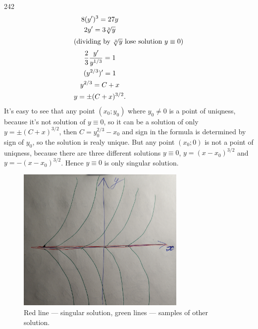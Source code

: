 \documentclass[12pt,a4paper]{article}
\begin{document}
    \begin{problem}{242}
        \begin{gather*}
            8(y')^3 = 27 y\\
            2y' = 3 \sqrt[3]{y}\\
            \intertext{(dividing by $\sqrt[3]{y}$ lose solution $y \equiv 0$)}
            \frac{2}{3} \frac{y'}{y^{1/3}} = 1\\
            (y^{2/3})' = 1\\
            y^{2/3} = C + x\\
            y = \pm (C + x)^{3/2}.
        \end{gather*}
        It's easy to see that any point $(x_0; y_0)$ where $y_0 \neq 0$ is a point of uniqness, because it's not solution of $y \equiv 0$, so it can be a solution of only $y = \pm (C + x)^{3/2}$, then $C = y_0^{2/3} - x_0$ and sign in the formula is determined by sign of $y_0$, so the solution is realy unique. But any point $(x_0; 0)$ is not a point of uniqness, because there are three different solutions $y \equiv 0$, $y = (x - x_0)^{3/2}$ and $y = -(x - x_0)^{3/2}$. Hence $y \equiv 0$ is only singular solution.
        \begin{figure}[H]
            \centering
            \includegraphics[height=7cm]{DEaDS-HW-006.jpg}
            \caption{Red line --- singular solution, green lines --- samples of other solution.}
        \end{figure}
    \end{problem}
\end{document}
